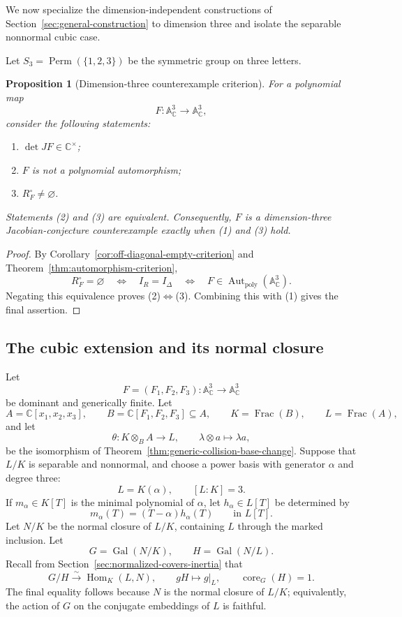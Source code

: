 \documentclass[11pt]{article}
\newtheorem{proposition}[theorem]{Proposition}
\theoremstyle{remark}
\theoremstyle{definition}
\DeclareMathOperator{\Frac}{Frac}
\DeclareMathOperator{\Gal}{Gal}
\DeclareMathOperator{\Hom}{Hom}
\DeclareMathOperator{\Aut}{Aut}
\DeclareMathOperator{\core}{core}
\newcommand{\A}{\mathbb A}
\newcommand{\C}{\mathbb C}
\begin{document}
We now specialize the dimension-independent constructions of
Section~\ref{sec:general-construction} to dimension three and isolate the
separable nonnormal cubic case.

Let \(S_3=\operatorname{Perm}(\{1,2,3\})\) be the symmetric group on
three letters.

\begin{proposition}[Dimension-three counterexample criterion]
\label{prop:dimension-three-counterexample-criterion}
For a polynomial map
\[
  F\colon\A^3_{\C}\longrightarrow\A^3_{\C},
\]
consider the following statements:
\begin{enumerate}[label=\textup{(\arabic*)}]
  \item \(\det JF\in\C^\times\);
  \item \(F\) is not a polynomial automorphism;
  \item \(R_F^\circ\neq\varnothing\).
\end{enumerate}
Statements \textup{(2)} and \textup{(3)} are equivalent.  Consequently,
\(F\) is a dimension-three Jacobian-conjecture counterexample exactly
when \textup{(1)} and \textup{(3)} hold.
\end{proposition}

\begin{proof}
By Corollary~\ref{cor:off-diagonal-empty-criterion} and
Theorem~\ref{thm:automorphism-criterion},
\[
  R_F^\circ=\varnothing
  \quad\Longleftrightarrow\quad
  I_R=I_\Delta
  \quad\Longleftrightarrow\quad
  F\in\Aut_{\mathrm{poly}}(\A^3_{\C}).
\]
Negating this equivalence proves
\textup{(2)}\(\Longleftrightarrow\)\textup{(3)}.  Combining this with
\textup{(1)} gives the final assertion.
\end{proof}

\subsection{The cubic extension and its normal closure}
\label{sec:cubic-extension}

Let
\[
  F=(F_1,F_2,F_3)\colon\A^3_{\C}\longrightarrow\A^3_{\C}
\]
be dominant and generically finite.  Let
\[
  A=\C[x_1,x_2,x_3],
  \qquad
  B=\C[F_1,F_2,F_3]\subseteq A,
  \qquad
  K=\Frac(B),
  \qquad
  L=\Frac(A),
\]
and let
\[
  \theta\colon K\otimes_BA\longrightarrow L,
  \qquad
  \lambda\otimes a\longmapsto\lambda a,
\]
be the isomorphism of
Theorem~\ref{thm:generic-collision-base-change}.  Suppose that \(L/K\)
is separable and nonnormal, and
choose a power basis with generator \(\alpha\) and degree three:
\[
  L=K(\alpha),
  \qquad
  [L:K]=3.
\]
If \(m_\alpha\in K[T]\) is the minimal polynomial of \(\alpha\), let
\(h_\alpha\in L[T]\) be determined by
\[
  m_\alpha(T)=(T-\alpha)h_\alpha(T)
  \qquad\text{in }L[T].
\]
Let \(N/K\) be the normal closure of \(L/K\), containing \(L\) through
the marked inclusion.  Let
\[
  G=\Gal(N/K),
  \qquad
  H=\Gal(N/L).
\]
Recall from Section~\ref{sec:normalized-covers-inertia} that
\[
  G/H\xrightarrow{\sim}\Hom_K(L,N),
  \qquad
  gH\longmapsto g|_L,
  \qquad
  \core_G(H)=1.
\]
The final equality follows because \(N\) is the normal closure of
\(L/K\); equivalently, the action of \(G\) on the conjugate embeddings
of \(L\) is faithful.
\end{document}
